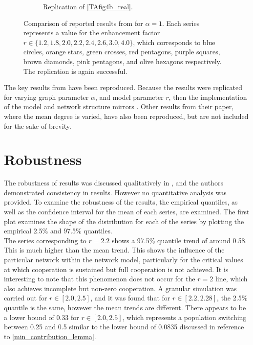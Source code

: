 \begin{figure}[!h]
\begin{subfigure}[b]{0.45\textwidth}
    \caption{Replication of \ref{TAfig4b_real}. }
    \label{TAfig4b}
  \end{subfigure}
  \caption{Comparison of reported results from \cite{RN49} for $\alpha = 1$. Each series represents a value for the enhancement factor $r \in \{1.2, 1.8, 2.0, 2.2, 2.4, 2.6, 3.0, 4.0\}$, which corresponds to blue circles, orange stars, green crosses, red pentagons, purple squares, brown diamonds, pink pentagons, and olive hexagons respectively. The replication is again successful. } \label{comp2}
\end{figure} 
\FloatBarrier

The key results from \cite{RN49} have been reproduced. Because the results were replicated for varying graph parameter $\alpha$, and model parameter $r$, then the implementation of the model and network structure mirrors \cite{RN49}. Other results from their paper, where the mean degree is varied, have also been reproduced, but are not included for the sake of brevity.\\


\section{Robustness}
The robustness of results was discussed qualitatively in \cite{RN49}, and the authors demonstrated consistency in results. However no quantitative analysis was provided. To examine the robustness of the results, the empirical quantiles, as well as the confidence interval for the mean of each series, are examined. The first plot examines the shape of the distribution for each of the series by plotting the empirical 2.5\% and 97.5\% quantiles. \\

\FloatBarrier
{}
\FloatBarrier
The series corresponding to $r=2.2$ shows a 97.5\% quantile trend of around 0.58. This is much higher than the mean trend. This shows the influence of the particular network within the network model, particularly for the critical values at which cooperation is sustained but full cooperation is not achieved. It is interesting to note that this phenomenon does not occur for the $r=2$ line, which also achieves incomplete but non-zero cooperation. A granular simulation was carried out for $r \in [2.0,2.5]$, and it was found that for $r \in [2.2, 2.28]$, the 2.5\% quantile is the same, however the mean trends are different. There appears to be a lower bound of 0.33 for $r \in [2.0, 2.5]$, which represents a population switching between 0.25 and 0.5 similar to the lower bound of 0.0835 discussed in reference to \ref{min_contribution_lemma}.\\

